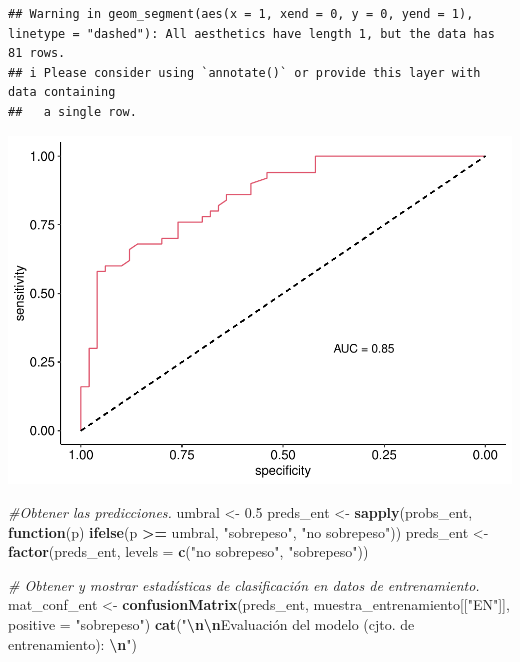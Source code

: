 \documentclass[
]{article}
\newenvironment{Shaded}{\begin{snugshade}}{\end{snugshade}}
\newcommand{\AttributeTok}[1]{\textcolor[rgb]{0.13,0.29,0.53}{#1}}
\newcommand{\CommentTok}[1]{\textcolor[rgb]{0.56,0.35,0.01}{\textit{#1}}}
\newcommand{\ControlFlowTok}[1]{\textcolor[rgb]{0.13,0.29,0.53}{\textbf{#1}}}
\newcommand{\FloatTok}[1]{\textcolor[rgb]{0.00,0.00,0.81}{#1}}
\newcommand{\FunctionTok}[1]{\textcolor[rgb]{0.13,0.29,0.53}{\textbf{#1}}}
\newcommand{\NormalTok}[1]{#1}
\newcommand{\OtherTok}[1]{\textcolor[rgb]{0.56,0.35,0.01}{#1}}
\newcommand{\SpecialCharTok}[1]{\textcolor[rgb]{0.81,0.36,0.00}{\textbf{#1}}}
\newcommand{\StringTok}[1]{\textcolor[rgb]{0.31,0.60,0.02}{#1}}
\begin{document}
\begin{verbatim}
## Warning in geom_segment(aes(x = 1, xend = 0, y = 0, yend = 1), linetype = "dashed"): All aesthetics have length 1, but the data has 81 rows.
## i Please consider using `annotate()` or provide this layer with data containing
##   a single row.
\end{verbatim}

\includegraphics{ep10_files/figure-latex/unnamed-chunk-5-1.pdf}

\begin{Shaded}
\begin{Highlighting}[]
\CommentTok{\#Obtener las predicciones.}
\NormalTok{umbral }\OtherTok{\textless{}{-}} \FloatTok{0.5}
\NormalTok{preds\_ent }\OtherTok{\textless{}{-}} \FunctionTok{sapply}\NormalTok{(probs\_ent,}
                    \ControlFlowTok{function}\NormalTok{(p) }\FunctionTok{ifelse}\NormalTok{(p }\SpecialCharTok{\textgreater{}=}\NormalTok{ umbral, }\StringTok{"sobrepeso"}\NormalTok{, }\StringTok{"no sobrepeso"}\NormalTok{)) }
\NormalTok{preds\_ent }\OtherTok{\textless{}{-}} \FunctionTok{factor}\NormalTok{(preds\_ent, }\AttributeTok{levels =} \FunctionTok{c}\NormalTok{(}\StringTok{"no sobrepeso"}\NormalTok{, }\StringTok{"sobrepeso"}\NormalTok{))}

\CommentTok{\# Obtener y mostrar estadísticas de clasificación en datos de entrenamiento. }
\NormalTok{mat\_conf\_ent }\OtherTok{\textless{}{-}} \FunctionTok{confusionMatrix}\NormalTok{(preds\_ent, muestra\_entrenamiento[[}\StringTok{"EN"}\NormalTok{]],}
                                \AttributeTok{positive =} \StringTok{"sobrepeso"}\NormalTok{)}
\FunctionTok{cat}\NormalTok{(}\StringTok{"}\SpecialCharTok{\textbackslash{}n\textbackslash{}n}\StringTok{Evaluación del modelo (cjto. de entrenamiento): }\SpecialCharTok{\textbackslash{}n}\StringTok{"}\NormalTok{)}
\end{Highlighting}
\end{Shaded}
\end{document}
